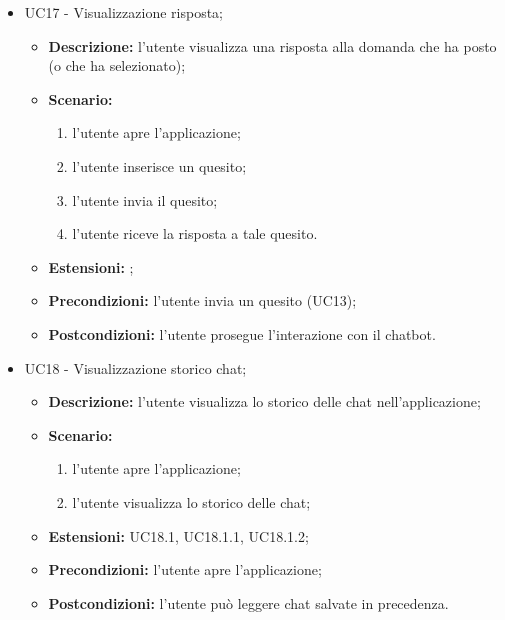 \documentclass[10pt, a4paper]{article}
\begin{document}
\begin{itemize}
    \item UC17 - Visualizzazione risposta;
    \begin{itemize}
        \item \textbf{Descrizione: }l'utente visualizza una risposta alla domanda che ha posto (o che ha selezionato);
        \item \textbf{Scenario: }
        \begin{enumerate}[label={\arabic*.}, align=left]
        \item l'utente apre l'applicazione;
        \item l'utente inserisce un quesito;
        \item l'utente invia il quesito;
        \item l'utente riceve la risposta a tale quesito.
        \end{enumerate}
        \item \textbf{Estensioni: };
        \item \textbf{Precondizioni:} l'utente invia un quesito (UC13);
        \item \textbf{Postcondizioni: }l'utente prosegue l'interazione con il chatbot.\\
    \end{itemize}
    
    \item UC18 - Visualizzazione storico chat;
    \begin{itemize}
        \item \textbf{Descrizione: }l'utente visualizza lo storico delle chat nell'applicazione;
        \item \textbf{Scenario: }
        \begin{enumerate}[label={\arabic*.}, align=left]        
        \item l'utente apre l'applicazione;
        \item l'utente visualizza lo storico delle chat;
        \end{enumerate}
        \item \textbf{Estensioni: } UC18.1, UC18.1.1, UC18.1.2;
        \item \textbf{Precondizioni:} l'utente apre l'applicazione;
        \item \textbf{Postcondizioni: }l'utente può leggere chat salvate in precedenza.
    \end{itemize}
    

\end{itemize}
\end{document}
